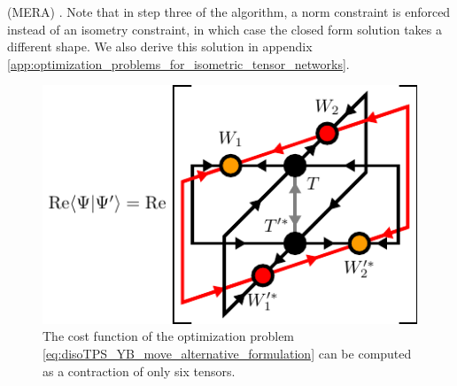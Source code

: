 (MERA) \cite{cite:algorithms_for_entanglement_renormalization, cite:algorithms_for_entanglement_renormalization_boundaries_impurities_interfaces}. Note that in step three of the algorithm, a norm constraint is enforced instead of an isometry constraint, in which case the closed form solution takes a different shape. We also derive this solution in appendix \ref{app:optimization_problems_for_isometric_tensor_networks}.\par
\begin{figure}
	\centering
	\includegraphics[scale=1]{figures/tikz/disoTPS/yang_baxter_move_iterative/yang_baxter_move_iterative_a.pdf}
	\caption{The cost function of the optimization problem \eqref{eq:disoTPS_YB_move_alternative_formulation} can be computed as a contraction of only six tensors.}
	\label{fig:YB_move_iterate_polar_overlap}
\end{figure}
